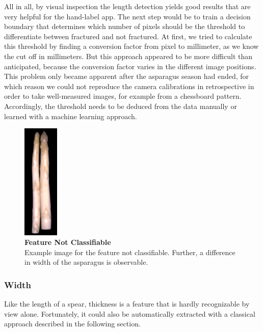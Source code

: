 \bigskip
All in all, by visual inspection the length detection yields good results that are very helpful for the hand-label app. The next step would be to train a decision boundary that determines which number of pixels should be the threshold to differentiate between fractured and not fractured. At first, we tried to calculate this threshold by finding a conversion factor from pixel to millimeter, as we know the cut off in millimeters. But this approach appeared to be more difficult than anticipated, because the conversion factor varies in the different image positions. This problem only became apparent after the asparagus season had ended, for which reason we could not reproduce the camera calibrations in retrospective in order to take well-measured images, for example from a chessboard pattern. Accordingly, the threshold needs to be deduced from the data manually or learned with a machine learning approach.

\begin{figure}
  \centering
  \includegraphics[width=0.15\textwidth]{Figures/chapter03/example_img_thick.png}
  \caption[Example Image Not Classifiable]{ \textbf{Feature Not Classifiable} \\ Example image for the feature not classifiable. Further, a difference in width of the asparagus is observable.}
  \label{fig:ExampleThickness}
  \vspace{-10pt}
\end{figure}

\subsubsection{Width}
\label{subsec:Width}

Like the length of a spear, thickness is a feature that is hardly recognizable by view alone. Fortunately, it could also be automatically extracted with a classical approach described in the following section.

